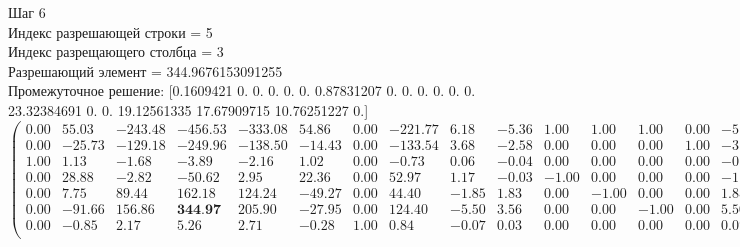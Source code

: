 \documentclass[draft]{article}
\begin{document}
\begin{flushleft}
    Шаг 6 \\
    Индекс разрешающей строки = 5\\
    Индекс разрещающего столбца = 3\\
    Разрешающий элемент = 344.9676153091255\\
    Промежуточное решение:
    [0.1609421  0.  0.  0.  0.  0.  0.87831207  0.  0.  0.  0.  0.  0.  23.32384691  0.  0.  19.12561335  17.67909715  10.76251227  0.]
\begin{equation*}
\begin{pmatrix}
    0.00 &  55.03 & -243.48 & -456.53 & -333.08 &  54.86 & 0.00 & -221.77 &  6.18 & -5.36 &  1.00 &  1.00 &  1.00 & 0.00 & -5.18 &  6.36 & 0.00 & 0.00 & 0.00 &  1.00 & -47.57 \\
    0.00 & -25.73 & -129.18 & -249.96 & -138.50 & -14.43 & 0.00 & -133.54 &  3.68 & -2.58 &  0.00 &  0.00 &  0.00 & 1.00 & -3.68 &  2.58 & 0.00 & 0.00 & 0.00 & -1.00 &  23.32 \\
    1.00 &   1.13 &   -1.68 &   -3.89 &   -2.16 &   1.02 & 0.00 &   -0.73 &  0.06 & -0.04 &  0.00 &  0.00 &  0.00 & 0.00 & -0.06 &  0.04 & 0.00 & 0.00 & 0.00 &  0.00 &   0.16 \\
    0.00 &  28.88 &   -2.82 &  -50.62 &    2.95 &  22.36 & 0.00 &   52.97 &  1.17 & -0.03 & -1.00 &  0.00 &  0.00 & 0.00 & -1.17 &  0.03 & 1.00 & 0.00 & 0.00 &  0.00 &  19.13 \\
    0.00 &   7.75 &   89.44 &  162.18 &  124.24 & -49.27 & 0.00 &   44.40 & -1.85 &  1.83 &  0.00 & -1.00 &  0.00 & 0.00 &  1.85 & -1.83 & 0.00 & 1.00 & 0.00 &  0.00 &  17.68 \\
    0.00 & -91.66 &  156.86 &  \textbf{344.97} &  205.90 & -27.95 & 0.00 &  124.40 & -5.50 &  3.56 &  0.00 &  0.00 & -1.00 & 0.00 &  5.50 & -3.56 & 0.00 & 0.00 & 1.00 &  0.00 &  10.76 \\
    0.00 &  -0.85 &    2.17 &    5.26 &    2.71 &  -0.28 & 1.00 &    0.84 & -0.07 &  0.03 &  0.00 &  0.00 &  0.00 & 0.00 &  0.07 & -0.03 & 0.00 & 0.00 & 0.00 &  0.00 &   0.88 \\
\end{pmatrix}
\end{equation*}
\end{flushleft}
\end{document}
